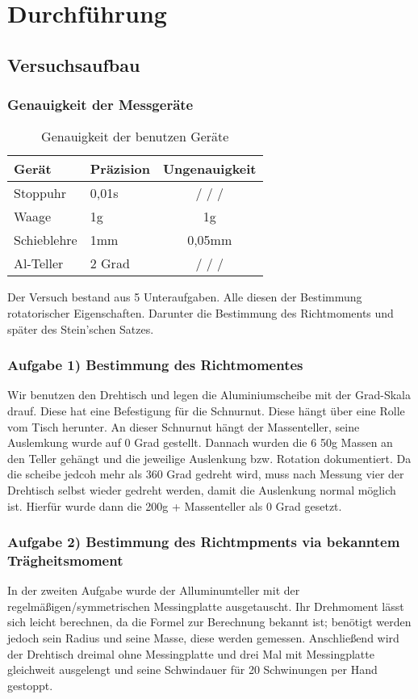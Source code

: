 \chapter{Durchführung}

\section{Versuchsaufbau}

\subsection*{Genauigkeit der Messgeräte}
\begin{table}[h!]
    \centering
    \begin{tabular}{l | l | c}
    Gerät & Präzision & Ungenauigkeit \\
    \hline
    Stoppuhr        & 0,01s     & / / / \\
    Waage           & 1g        & 1g \\
    Schieblehre     & 1mm       & 0,05mm \\
    Al-Teller       & 2 Grad    & / / / \\
    \hline
    \end{tabular}
    \caption{Genauigkeit der benutzen Geräte \cite{Stoppuhr,Waage}}
    \label{tab:genauigkeit_der_geräte}
\end{table}

Der Versuch bestand aus 5 Unteraufgaben. Alle diesen der Bestimmung rotatorischer Eigenschaften. 
Darunter die Bestimmung des Richtmoments und später des Stein'schen Satzes.
\subsection*{Aufgabe 1) Bestimmung des Richtmomentes}
Wir benutzen den Drehtisch und legen die Aluminiumscheibe mit der Grad-Skala drauf.
Diese hat eine Befestigung für die Schnurnut. Diese hängt über eine Rolle vom Tisch herunter. 
An dieser Schnurnut hängt der Massenteller, seine Auslemkung wurde auf 0 Grad gestellt.
Dannach wurden die 6 50g Massen an den Teller gehängt und die jeweilige Auslenkung bzw. Rotation dokumentiert.
Da die scheibe jedcoh mehr als 360 Grad gedreht wird, muss nach Messung vier der Drehtisch selbst wieder gedreht werden, 
damit die Auslenkung normal möglich ist. Hierfür wurde dann die 200g + Massenteller als 0 Grad gesetzt.

\subsection*{Aufgabe 2) Bestimmung des Richtmpments via bekanntem Trägheitsmoment}
In der zweiten Aufgabe wurde der Alluminumteller mit der regelmäßigen/symmetrischen Messingplatte ausgetauscht. 
Ihr Drehmoment lässt sich leicht berechnen, da die Formel zur Berechnung bekannt ist; 
benötigt werden jedoch sein Radius und seine Masse, diese werden gemessen. 
Anschließend wird der Drehtisch dreimal ohne Messingplatte und drei Mal mit Messingplatte gleichweit ausgelengt 
und seine Schwindauer für 20 Schwinungen per Hand gestoppt. 

